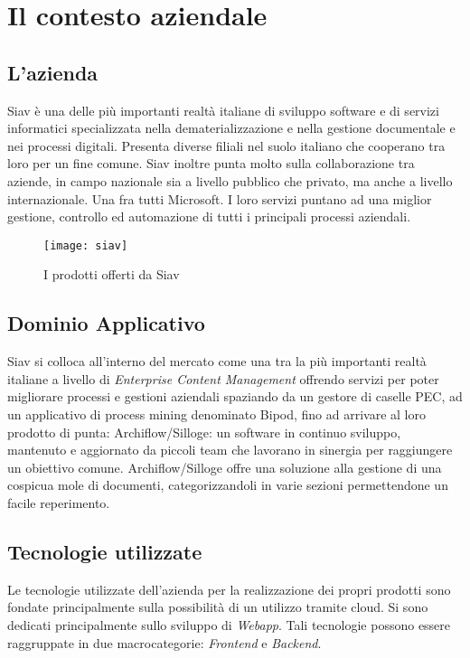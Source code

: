 
\chapter{Il contesto aziendale}

\section{L'azienda}
Siav è una delle più importanti realtà italiane di sviluppo software e di servizi informatici
specializzata nella dematerializzazione e nella gestione documentale e nei processi
digitali. Presenta diverse filiali nel suolo italiano che cooperano tra loro per un fine comune. Siav inoltre punta molto sulla collaborazione tra aziende, in campo nazionale sia a livello pubblico che privato, ma anche a livello internazionale. Una fra tutti Microsoft.
I loro servizi puntano ad una miglior gestione, controllo ed automazione di tutti i principali processi aziendali.
\begin{figure}[!h] 
	\centering 
	\texttt{[image: siav]} 
	\caption{I prodotti offerti da Siav}
\end{figure}

\section {Dominio Applicativo}
Siav si colloca all'interno del mercato come una tra la più importanti realtà italiane a livello di \textit{Enterprise Content Management} offrendo servizi per poter migliorare processi e gestioni aziendali spaziando da un gestore di caselle PEC, ad un applicativo di process mining denominato Bipod, fino ad arrivare al loro prodotto di punta: Archiflow/Silloge: un software in continuo sviluppo, mantenuto e aggiornato da piccoli team che lavorano in sinergia per raggiungere un obiettivo comune. Archiflow/Silloge offre una soluzione alla gestione di una cospicua mole di documenti, categorizzandoli in varie sezioni permettendone un facile reperimento.

\section {Tecnologie utilizzate}
Le tecnologie utilizzate dell'azienda per la realizzazione dei propri prodotti sono fondate principalmente sulla possibilità di un utilizzo tramite cloud. Si sono dedicati principalmente sullo sviluppo di \textit{Webapp}. Tali tecnologie possono essere raggruppate in due macrocategorie: \textit{Frontend} e \textit{Backend}.
